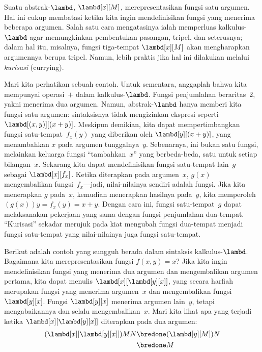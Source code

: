 \documentclass[../../../include/open-logic-section]{subfiles}
\begin{document}

Suatu abstrak-$\lambd$, $\lambd[x][M]$, merepresentasikan fungsi satu
argumen. Hal ini cukup membatasi ketika kita ingin mendefinisikan fungsi yang
menerima beberapa argumen. Salah satu cara mengatasinya ialah memperluas
kalkulus-$\lambd$ agar memungkinkan pembentukan pasangan, tripel, dan
seterusnya; dalam hal itu, misalnya, fungsi tiga-tempat $\lambd[x][M]$ akan
mengharapkan argumennya berupa tripel. Namun, lebih praktis jika hal ini
dilakukan melalui \emph{kurisasi} (currying).

Mari kita perhatikan sebuah contoh. Untuk sementara, anggaplah bahwa kita
mempunyai operasi~$+$ dalam kalkulus-$\lambd$. Fungsi penjumlahan beraritas~2,
yakni menerima dua argumen. Namun, abstrak-$\lambd$ hanya memberi kita fungsi
satu argumen: sintaksisnya tidak mengizinkan ekspresi seperti
$\lambd[(x,y)][(x+y)]$. Meskipun demikian, kita dapat mempertimbangkan fungsi
satu-tempat~$f_x(y)$ yang diberikan oleh $\lambd[y][(x+y)]$, yang menambahkan
$x$ pada argumen tunggalnya~$y$. Sebenarnya, ini bukan satu fungsi, melainkan
keluarga fungsi ``tambahkan~$x$'' yang berbeda-beda, satu untuk setiap
bilangan~$x$. Sekarang kita dapat mendefinisikan fungsi satu-tempat lain~$g$
sebagai $\lambd[x][f_x]$. Ketika diterapkan pada argumen~$x$, $g(x)$
mengembalikan fungsi~$f_x$---jadi, nilai-nilainya sendiri adalah fungsi. Jika
kita menerapkan $g$ pada~$x$, kemudian menerapkan hasilnya pada~$y$, kita
memperoleh $(g(x))y=f_x(y)=x+y$. Dengan cara ini, fungsi satu-tempat~$g$ dapat
melaksanakan pekerjaan yang sama dengan fungsi penjumlahan dua-tempat.
``Kurisasi'' sekadar merujuk pada kiat mengubah fungsi dua-tempat menjadi
fungsi satu-tempat yang nilai-nilainya juga fungsi satu-tempat.

Berikut adalah contoh yang sungguh berada dalam sintaksis kalkulus-$\lambd$.
Bagaimana kita merepresentasikan fungsi $f(x,y)=x$? Jika kita ingin
mendefinisikan fungsi yang menerima dua argumen dan mengembalikan argumen
pertama, kita dapat menulis $\lambd[x][\lambd[y][x]]$, yang secara harfiah
merupakan fungsi yang menerima argumen~$x$ dan mengembalikan fungsi
$\lambd[y][x]$. Fungsi $\lambd[y][x]$ menerima argumen lain~$y$, tetapi
mengabaikannya dan selalu mengembalikan~$x$. Mari kita lihat apa yang terjadi
ketika $\lambd[x][\lambd[y][x]]$ diterapkan pada dua argumen:
\begin{align*}
  (\lambd[x][\lambd[y][x]])MN
  \bredone & (\lambd[y][M])N \\
  \bredone & M
\end{align*}
\end{document}
